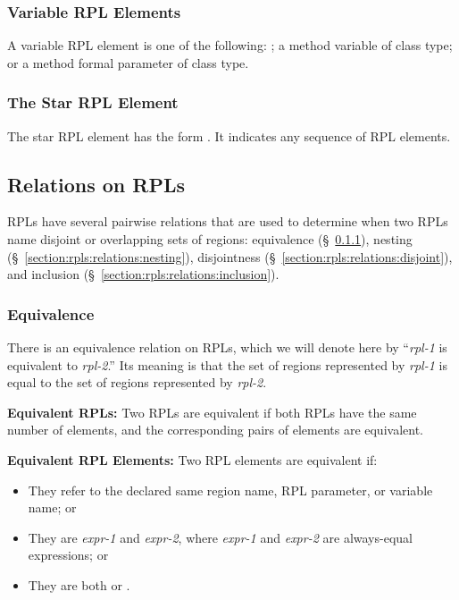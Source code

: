 \subsubsection{Variable RPL Elements}
\label{section:rpls:elts:var}

A variable RPL element is one of the following: ; a
 method variable of class type; or a  method
formal parameter of class type.

\subsubsection{The Star RPL Element}
\label{section:rpls:elts:star}

The star RPL element has the form \kwd{*}.  It indicates any sequence
of RPL elements.

\subsection{Relations on RPLs}
\label{section:rpls:relations}

RPLs have several pairwise relations that are used to determine when
two RPLs name disjoint or overlapping sets of regions: equivalence
(\S~\ref{section:rpls:relations:equiv}), nesting
(\S~\ref{section:rpls:relations:nesting}), disjointness
(\S~\ref{section:rpls:relations:disjoint}), and inclusion
(\S~\ref{section:rpls:relations:inclusion}).

\subsubsection{Equivalence}
\label{section:rpls:relations:equiv}

There is an equivalence relation on RPLs, which we will denote here by
``\emph{rpl-1} is equivalent to \emph{rpl-2}.''  Its meaning is that
the set of regions represented by \emph{rpl-1} is equal to the set of
regions represented by \emph{rpl-2}.

\noindent
\textbf{Equivalent RPLs:} Two RPLs are equivalent if both RPLs have
the same number of elements, and the corresponding pairs of elements
are equivalent.  

\noindent
\textbf{Equivalent RPL Elements:} Two RPL elements are equivalent if:
%
\begin{itemize}
%
\item They refer to the declared same region name, RPL parameter, or
  variable name; or
%
\item They are \kwd{[}\emph{expr-1}\kwd{]} and
  \kwd{[}\emph{expr-2}\kwd{]}, where \emph{expr-1} and \emph{expr-2}
  are always-equal expressions; or
%
\item They are both \kwd{[?]} or \kwd{*}.
%
\end{itemize}


